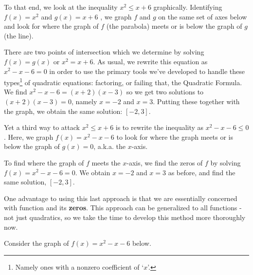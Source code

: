 \documentclass{ximera}
\begin{document}
\medskip

To that end, we look at the inequality $x^2 \leq x+6$ graphically.  Identifying $f(x) = x^2$ and $g(x) = x+6$ , we graph $f$ and $g$ on the same set of axes below and look for where the graph of $f$ (the parabola) meets or is below the graph of $g$ (the line).  


\begin{center}
\end{center}

There are two points of intersection which we determine by solving  $f(x) = g(x)$ or $x^2=x+6$.  As usual, we rewrite this equation as $x^2-x-6 = 0$ in order to use the primary tools we've developed to handle these types\footnote{Namely ones with a nonzero coefficient of `$x$'.} of quadratic equations: factoring, or failing that, the Quadratic Formula.  We find $x^2-x-6 = (x+2)(x-3)$ so we get two solutions to $(x+2)(x-3) = 0$, namely $x = -2$ and $x = 3$.  Putting these together with the graph, we obtain the same solution:  $[-2,3]$.  


Yet a third way to attack $x^2 \leq x+6$ is to rewrite the inequality as $x^2-x-6 \leq 0$.  Here, we graph $f(x) = x^2-x-6$ to look for where the graph meets or is below the graph of $g(x) = 0$, a.k.a. the $x$-axis.


\begin{center}
\end{center}

To find where the graph of $f$ meets the $x$-axis, we find the zeros of $f$ by solving  $f(x) = x^2-x-6=0$. We obtain $x =-2$ and $x = 3$ as before, and find the same solution, $[-2,3]$.  



One advantage to using this last approach is that we are essentially concerned with  function and its \textbf{zeros}.  This approach can be generalized to all functions - not just quadratics, so we take the time to develop this method more thoroughly now.  



Consider the graph of $f(x) = x^2-x-6$ below.
\end{document}
